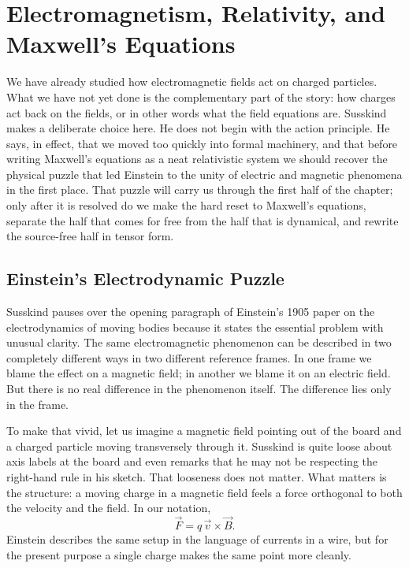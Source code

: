 \chapter{Electromagnetism, Relativity, and Maxwell's Equations}

We have already studied how electromagnetic fields act on charged particles. What we have not yet done is the complementary part of the story: how charges act back on the fields, or in other words what the field equations are. Susskind makes a deliberate choice here. He does not begin with the action principle. He says, in effect, that we moved too quickly into formal machinery, and that before writing Maxwell's equations as a neat relativistic system we should recover the physical puzzle that led Einstein to the unity of electric and magnetic phenomena in the first place. That puzzle will carry us through the first half of the chapter; only after it is resolved do we make the hard reset to Maxwell's equations, separate the half that comes for free from the half that is dynamical, and rewrite the source-free half in tensor form.

\section{Einstein's Electrodynamic Puzzle}

Susskind pauses over the opening paragraph of Einstein's 1905 paper on the electrodynamics of moving bodies because it states the essential problem with unusual clarity. The same electromagnetic phenomenon can be described in two completely different ways in two different reference frames. In one frame we blame the effect on a magnetic field; in another we blame it on an electric field. But there is no real difference in the phenomenon itself. The difference lies only in the frame.

To make that vivid, let us imagine a magnetic field pointing out of the board and a charged particle moving transversely through it. Susskind is quite loose about axis labels at the board and even remarks that he may not be respecting the right-hand rule in his sketch. That looseness does not matter. What matters is the structure: a moving charge in a magnetic field feels a force orthogonal to both the velocity and the field. In our notation,
\begin{equation}
\vec F=q\,\vec v\times \vec B.
\end{equation}
Einstein describes the same setup in the language of currents in a wire, but for the present purpose a single charge makes the same point more cleanly.

